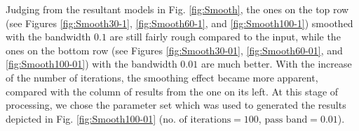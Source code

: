 Judging from the resultant models in Fig. \ref{fig:Smooth}, the ones on the top row (see Figures \ref{fig:Smooth30-1}, \ref{fig:Smooth60-1}, and \ref{fig:Smooth100-1}) smoothed with the bandwidth $0.1$ are still fairly rough compared to the input, while the ones on the bottom row (see Figures \ref{fig:Smooth30-01}, \ref{fig:Smooth60-01}, and \ref{fig:Smooth100-01}) with the bandwidth $0.01$ are much better. %
With the increase of the number of iterations, the smoothing effect became more apparent, compared with the column of results from the one on its left.
At this stage of processing, we chose the parameter set which was used to generated the results depicted in Fig. \ref{fig:Smooth100-01} ($\text{no. of iterations} = 100$, $\text{pass band} = 0.01$). %
\begin{figure}[t]
\centering
{}
\hfil
{}
\hfil
{}
\end{figure}
